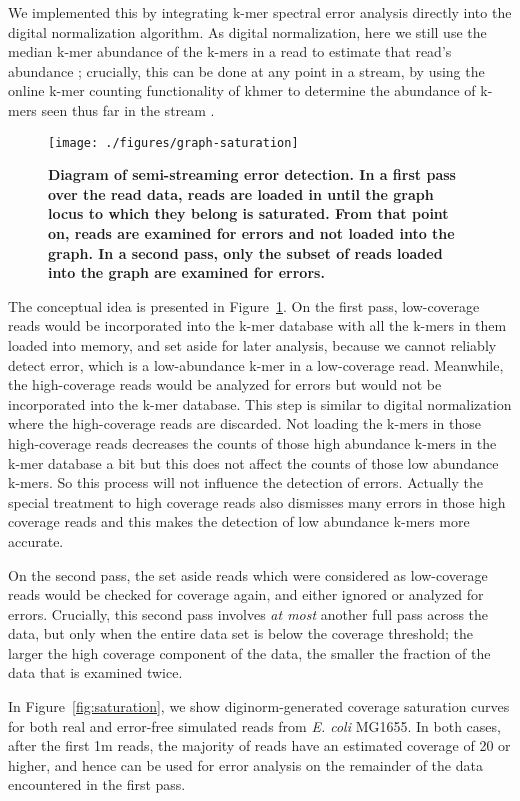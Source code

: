 We implemented this by integrating k-mer spectral
error analysis directly into the digital normalization algorithm.
As digital normalization, here we
still use the median k-mer abundance of the k-mers in a read to
estimate that read's abundance \cite{Brown2012}; crucially, this can
be done at any point in a stream, by using the online k-mer counting
functionality of khmer to determine the abundance of k-mers seen thus
far in the stream \cite{Zhang2014}. 


\begin{figure}[!ht]
 \centerline{\texttt{[image: ./figures/graph-saturation]}}
\caption{\bf Diagram of semi-streaming error detection. In a first pass
over the read data, reads are loaded in until the graph locus to which
they belong is saturated.  From that point on, reads are examined for
errors and not loaded into the graph.  In a second pass, only the subset
of reads loaded into the graph are examined for errors.}
\label{fig:concept}
\end{figure}

The conceptual idea is presented in Figure~\ref{fig:concept}.  On the
first pass, low-coverage reads would be incorporated into the k-mer
database with all the k-mers in them loaded into memory, and set aside for later analysis, because we cannot reliably detect error, which 
is a low-abundance k-mer in a low-coverage read. 
Meanwhile, the high-coverage reads
would be analyzed for errors but would not be incorporated into the k-mer database.
This step is similar to digital normalization where the high-coverage reads are
discarded. Not loading the k-mers in those high-coverage reads decreases the
counts of those high abundance k-mers in the k-mer database a bit but this
does not affect the counts of those low abundance k-mers. So this process will
not influence the detection of errors. 
Actually the special treatment to high coverage reads also dismisses many errors in
those high coverage reads 
and this makes the detection of low abundance k-mers more accurate.

On the second pass, the set aside reads which were considered as low-coverage reads
would be checked for coverage again, and either ignored or analyzed
for errors.  Crucially, this second pass involves {\em at most}
another full pass across the data, but only when the entire data set
is below the coverage threshold; the larger the high coverage
component of the data, the smaller the fraction of the data that is
examined twice.


In Figure~\ref{fig:saturation}, we show diginorm-generated coverage
saturation curves for both real and error-free simulated reads from
{\em E. coli} MG1655.  In both cases, after the first 1m reads, the
majority of reads have an estimated coverage of 20 or higher, and
hence can be used for error analysis on the remainder of the data
encountered in the first pass.

